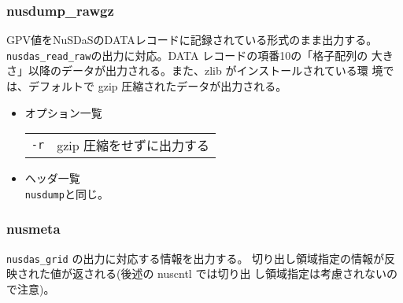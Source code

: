 \subsubsection{nusdump\_rawgz}
GPV値をNuSDaSのDATAレコードに記録されている形式のまま出力する。
\verb|nusdas_read_raw|の出力に対応。DATA レコードの項番10の「格子配列の
大きさ」以降のデータが出力される。また、zlib がインストールされている環
境では、デフォルトで gzip 圧縮されたデータが出力される。
\begin{itemize}
\item オプション一覧\\
\begin{tabular}{ll}
{\tt -r} & gzip 圧縮をせずに出力する
\end{tabular} 
\item ヘッダ一覧\\
\verb|nusdump|と同じ。
\end{itemize}

\subsubsection{nusmeta}
{\tt nusdas\_grid} の出力に対応する情報を出力する。
切り出し領域指定の情報が反映された値が返される(後述の nuscntl では切り出
し領域指定は考慮されないので注意)。

